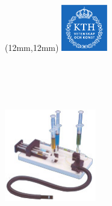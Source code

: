 
\usepackage{xr-hyper} %






\usepackage[absolute,overlay]{textpos}

\usepackage[capitalise,noabbrev,swedish]{cleveref} %

\providecommand{\projecttitle}{Laborationshandledning -- Stopped flow \\
KD1080}




\makeatletter
    \begin{titlepage}
\begin{textblock*}{2cm}(12mm,12mm) %
\includegraphics[width=2cm]{fig/kth.pdf}
\end{textblock*}
      \begin{center}
        ~\\[20ex]
            {\LARGE \bfseries \sffamily \@title }\\[4ex]
            {\Large  \@author}\\[4ex]
            \@date \\[14ex]
            \includegraphics[width=4cm]{fig/setup.jpg}
        \end{center}
    \end{titlepage}
\makeatother
\thispagestyle{empty}
\newpage

\thispagestyle{empty}
\newpage

